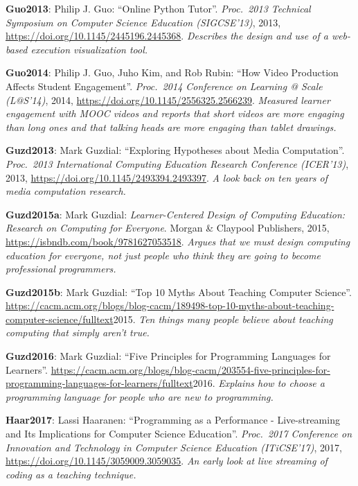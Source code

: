 \textbf{\hypertarget{b:Guo2013}{Guo2013}\label{b:Guo2013}}: Philip J. Guo: ``Online Python Tutor''. \emph{Proc.\ 2013 Technical Symposium on Computer Science Education (SIGCSE'13)}, 2013, \url{https://doi.org/10.1145/2445196.2445368}. \emph{Describes the design and use of a web-based execution visualization tool.}

\textbf{\hypertarget{b:Guo2014}{Guo2014}\label{b:Guo2014}}: Philip J. Guo, Juho Kim, and Rob Rubin: ``How Video Production Affects Student Engagement''. \emph{Proc.\ 2014 Conference on Learning @ Scale (L@S'14)}, 2014, \url{https://doi.org/10.1145/2556325.2566239}. \emph{Measured learner engagement with MOOC videos and reports that short videos are more engaging than long ones and that talking heads are more engaging than tablet drawings.}

\textbf{\hypertarget{b:Guzd2013}{Guzd2013}\label{b:Guzd2013}}: Mark Guzdial: ``Exploring Hypotheses about Media Computation''. \emph{Proc.\ 2013 International Computing Education Research Conference (ICER'13)}, 2013, \url{https://doi.org/10.1145/2493394.2493397}. \emph{A look back on ten years of media computation research.}

\textbf{\hypertarget{b:Guzd2015a}{Guzd2015a}\label{b:Guzd2015a}}: Mark Guzdial: \emph{Learner-Centered Design of Computing Education: Research on Computing for Everyone}. Morgan \& Claypool Publishers, 2015, \url{https://isbndb.com/book/9781627053518}. \emph{Argues that we must design computing education for everyone, not just people who think they are going to become professional programmers.}

\textbf{\hypertarget{b:Guzd2015b}{Guzd2015b}\label{b:Guzd2015b}}: Mark Guzdial: ``Top 10 Myths About Teaching Computer Science''. \url{https://cacm.acm.org/blogs/blog-cacm/189498-top-10-myths-about-teaching-computer-science/fulltext}2015. \emph{Ten things many people believe about teaching computing that simply aren't true.}

\textbf{\hypertarget{b:Guzd2016}{Guzd2016}\label{b:Guzd2016}}: Mark Guzdial: ``Five Principles for Programming Languages for Learners''. \url{https://cacm.acm.org/blogs/blog-cacm/203554-five-principles-for-programming-languages-for-learners/fulltext}2016. \emph{Explains how to choose a programming language for people who are new to programming.}

\textbf{\hypertarget{b:Haar2017}{Haar2017}\label{b:Haar2017}}: Lassi Haaranen: ``Programming as a Performance - Live-streaming and Its Implications for Computer Science Education''. \emph{Proc.\ 2017 Conference on Innovation and Technology in Computer Science Education (ITiCSE'17)}, 2017, \url{https://doi.org/10.1145/3059009.3059035}. \emph{An early look at live streaming of coding as a teaching technique.}


